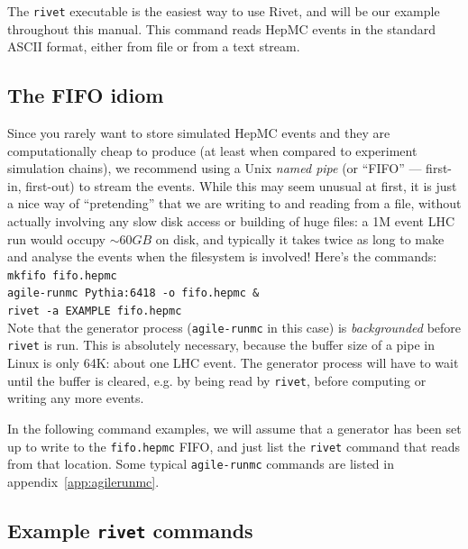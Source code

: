 \documentclass{JHEP3}
\newcommand{\kbd}[1]{\texttt{#1}\xspace}
\newcommand{\inp}[1]{\textsf{\textdollar}\hspace{1mm}\texttt{#1}\xspace}
\newcommand{\AppendixRef}[1]{appendix~\ref{#1}}
\begin{document}
The \kbd{rivet} executable is the easiest way to use Rivet, and will be our
example throughout this manual. This command reads HepMC events in the standard
ASCII format, either from file or from a text stream.

\subsection{The FIFO idiom}

Since you rarely want to store simulated HepMC events and they are
computationally cheap to produce (at least when compared to experiment
simulation chains), we recommend using a Unix \emph{named pipe} (or ``FIFO'' ---
first-in, first-out) to stream the events. While this may seem unusual at first,
it is just a nice way of ``pretending'' that we are writing to and reading from
a file, without actually involving any slow disk access or building of huge
files: a 1M event LHC run would occupy $\sim 60 GB$ on disk, and typically it
takes twice as long to make
and analyse the events when the filesystem is involved! Here's the commands:\\
\inp{mkfifo fifo.hepmc}\\
\inp{agile-runmc Pythia:6418 -o fifo.hepmc \&}\\
\inp{rivet -a EXAMPLE fifo.hepmc}\\
Note that the generator process (\kbd{agile-runmc} in this case) is
\emph{backgrounded} before \kbd{rivet} is run. This is absolutely necessary,
because the buffer size of a pipe in Linux is only 64K: about one LHC event. The
generator process will have to wait until the buffer is cleared, e.g. by being
read by \kbd{rivet}, before computing or writing any more events.


In the following command examples, we will assume that a generator has been set
up to write to the \kbd{fifo.hepmc} FIFO, and just list the \kbd{rivet} command
that reads from that location. Some typical \kbd{agile-runmc} commands are
listed in \AppendixRef{app:agilerunmc}.


\subsection{Example \kbd{rivet} commands}
\end{document}
